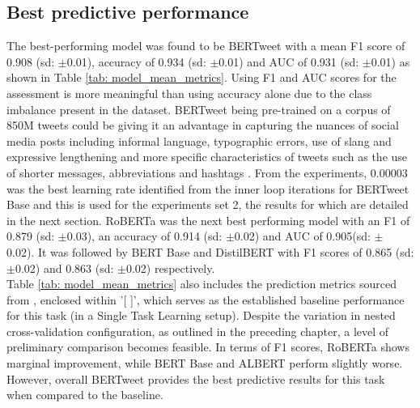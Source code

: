 \subsection{Best predictive performance}
The best-performing model was found to be BERTweet with a mean F1 score of 0.908 (sd: $\pm$0.01), accuracy of 0.934 (sd: $\pm$0.01) and AUC of 0.931 (sd: $\pm$0.01) as shown in Table \ref{tab: model_mean_metrics}. Using F1 and AUC scores for the assessment is more meaningful than using accuracy alone due to the class imbalance present in the dataset. BERTweet being pre-trained on a corpus of 850M tweets could be giving it an advantage in capturing the nuances of social media posts including informal language, typographic errors, use of slang and expressive lengthening and more specific characteristics of tweets such as the use of shorter messages, abbreviations and hashtags \cite{nguyenBERTweetPretrainedLanguage2020}. From the experiments, 0.00003 was the best learning rate identified from the inner loop iterations for BERTweet Base and this is used for the experiments set 2, the results for which are detailed in the next section. RoBERTa was the next best performing model with an F1 of 0.879 (sd: $\pm$0.03), an accuracy of 0.914 (sd: $\pm$0.02) and AUC of 0.905(sd: $\pm$ 0.02). It was followed by BERT Base and DistilBERT with F1 scores of 0.865 (sd: $\pm$0.02) and 0.863 (sd: $\pm$0.02) respectively.\\

Table \ref{tab: model_mean_metrics} also includes the prediction metrics sourced from \cite{jin_complaint_2020}, enclosed within '[ ]', which serves as the established baseline performance for this task (in a Single Task Learning setup). Despite the variation in nested cross-validation configuration, as outlined in the preceding chapter, a level of preliminary comparison becomes feasible. In terms of F1 scores, RoBERTa shows marginal improvement, while BERT Base and ALBERT perform slightly worse. However, overall BERTweet provides the best predictive results for this task when compared to the baseline.\\

